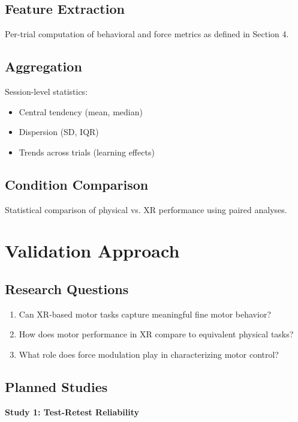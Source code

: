 \documentclass[11pt,twocolumn]{article}
\begin{document}
\subsection{Feature Extraction}

Per-trial computation of behavioral and force metrics as defined in Section 4.

\subsection{Aggregation}

Session-level statistics:
\begin{itemize}
    \item Central tendency (mean, median)
    \item Dispersion (SD, IQR)
    \item Trends across trials (learning effects)
\end{itemize}

\subsection{Condition Comparison}

Statistical comparison of physical vs. XR performance using paired analyses.

\section{Validation Approach}

\subsection{Research Questions}

\begin{enumerate}
    \item Can XR-based motor tasks capture meaningful fine motor behavior?
    \item How does motor performance in XR compare to equivalent physical tasks?
    \item What role does force modulation play in characterizing motor control?
\end{enumerate}

\subsection{Planned Studies}

\textbf{Study 1: Test-Retest Reliability}
\end{document}
